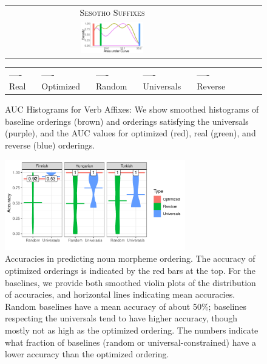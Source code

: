 \documentclass[man]{apa7}
\begin{document}
\begin{figure}
\begin{center}
\begin{tabular}{cccccc}
            \\
            \textsc{Sesotho Suffixes} \\
            \includegraphics[width=0.3\textwidth]{figures/sesotho_suffixes/suffixes-byMorphemes-auc-hist-heldout-Coarse-FineSurprisal-optimized.pdf}
    \end{tabular}

    \begin{tabular}{llllllll}
\textbf{\textcolor{real}{----}} Real&
\textbf{\textcolor{optimized}{----}} Optimized&
\textbf{\textcolor{random}{----}} Random&
\textbf{\textcolor{universals}{----}} Universals&
\textbf{\textcolor{reverse}{----}} Reverse
\end{tabular}
    \end{center}
    \caption{AUC Histograms for Verb Affixes: We show smoothed histograms of baseline orderings (brown) and orderings satisfying the universals (purple), and the AUC values for optimized (red), real (green), and reverse (blue) orderings. %
	}
    \label{fig:auc_verbs}
\end{figure}


\begin{figure}[]
    \centering
\includegraphics[width=0.7\textwidth]{figures/accuracies_nouns.pdf}
    \caption{Accuracies in predicting noun morpheme ordering.
The accuracy of optimized orderings is indicated by the red bars at the top.
    For the baselines, we provide both smoothed violin plots of the distribution of accuracies, and horizontal lines indicating mean accuracies.
    Random baselines have a mean accuracy of about 50\%; baselines respecting the universals tend to have higher accuracy, though mostly not as high as the optimized ordering.
	The numbers indicate what fraction of baselines (random or universal-constrained) have a lower accuracy than the optimized ordering.}
    \label{tab:optimized_acc_nouns}
\end{figure}
\end{document}
